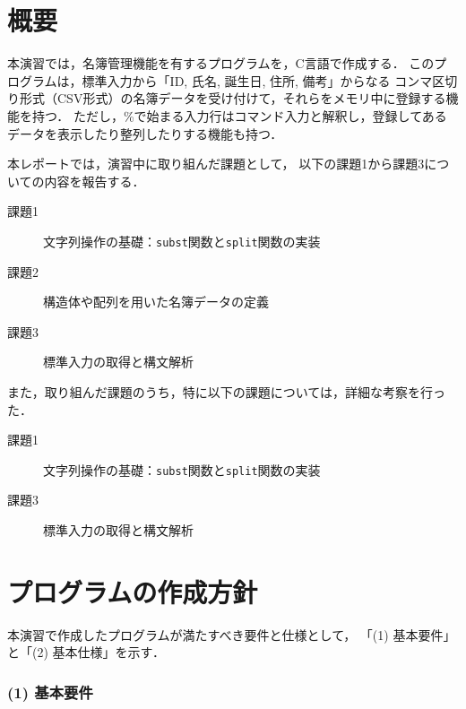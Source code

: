 \section{概要} \label{sec:abstract}

本演習では，名簿管理機能を有するプログラムを，C言語で作成する．
このプログラムは，標準入力から「ID, 氏名, 誕生日, 住所, 備考」からなる
コンマ区切り形式（CSV形式）の名簿データを受け付けて，それらをメモリ中に登録する機能を持つ．
ただし，\%で始まる入力行はコマンド入力と解釈し，登録してあるデータを表示したり整列したりする機能も持つ．

本レポートでは，演習中に取り組んだ課題として，
以下の課題1から課題3についての内容を報告する．
%
\begin{description}
  \item[課題1] 文字列操作の基礎：\verb|subst|関数と\verb|split|関数の実装
  \item[課題2] 構造体や配列を用いた名簿データの定義
  \item[課題3] 標準入力の取得と構文解析
\end{description}
%
また，取り組んだ課題のうち，特に以下の課題については，詳細な考察を行った．
%
\begin{description}
  \item[課題1] 文字列操作の基礎：\verb|subst|関数と\verb|split|関数の実装
  \item[課題3] 標準入力の取得と構文解析
\end{description}


\section{プログラムの作成方針}\label{sec:plan}

本演習で作成したプログラムが満たすべき要件と仕様として，
「(1) 基本要件」と「(2) 基本仕様」を示す．

\subsubsection*{(1) 基本要件}

